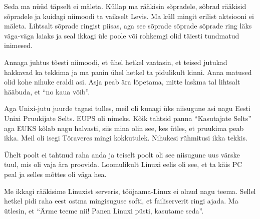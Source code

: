 
Seda ma nüüd täpselt ei mäleta. Küllap ma rääkisin sõpradele,  sõbrad rääkisid 
sõpradele ja kuidagi niimoodi ta vaikselt Levis. Ma küll mingit erilist 
aktsiooni ei mäleta. Lihtsalt sõprade ringist piisas, aga see sõprade sõprade 
sõprade ring läks väga-väga laiaks ja seal ikkagi üle poole või rohkemgi olid 
täiesti tundmatud inimesed. 

Annaga juhtus tõesti niimoodi, et ühel hetkel vaatasin, et 
teised jutukad hakkavad ka tekkima ja ma panin ühel hetkel ta pidulikult kinni. 
Anna matused olid kohe nihuke eraldi asi. Asja peab ära lõpetama, mitte laskma 
tal lihtsalt hääbuda, et \enquote{no kaua võib}. 

Aga Unixi-jutu  juurde tagasi tulles,  meil oli kunagi üks niisugune asi nagu 
Eesti Unixi Pruukijate Selts. EUPS 
oli nimeks. Kõik  tahtsid panna \enquote{Kasutajate Selts} aga EUKS kõlab nagu 
halvasti, siis mina olin see, kes ütles, et pruukima peab ikka. Meil oli isegi 
Tõraveres mingi kokkutulek. Nihukesi rühmitusi ikka tekkis.


Ühelt poolt ei tahtnud raha anda ja teiselt poolt oli see niisugune uus värske 
tuul, mis oli vaja ära proovida. Loomulikult Linuxi eelis oli see, et ta käis 
PC peal  ja  selles mõttes oli väga hea. 


Me ikkagi rääkisime Linuxist serveris, tööjaama-Linux ei olnud nagu teema. 
Sellel hetkel pidi raha eest ostma mingisuguse softi, et failiserverit ringi 
ajada. Ma ütlesin, et \enquote{Ärme teeme nii! Panen Linuxi püsti, kasutame 
seda}. 



